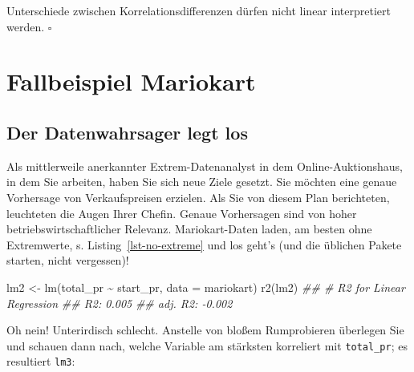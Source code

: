 \documentclass[
  letterpaper,
  twoside,
  open=any]{scrbook}
\newenvironment{Shaded}{\begin{snugshade}}{\end{snugshade}}
\newcommand{\AttributeTok}[1]{\textcolor[rgb]{0.40,0.45,0.13}{#1}}
\newcommand{\DocumentationTok}[1]{\textcolor[rgb]{0.37,0.37,0.37}{\textit{#1}}}
\newcommand{\FunctionTok}[1]{\textcolor[rgb]{0.28,0.35,0.67}{#1}}
\newcommand{\NormalTok}[1]{\textcolor[rgb]{0.00,0.23,0.31}{#1}}
\newcommand{\OtherTok}[1]{\textcolor[rgb]{0.00,0.23,0.31}{#1}}
\newcommand{\SpecialCharTok}[1]{\textcolor[rgb]{0.37,0.37,0.37}{#1}}
\theoremstyle{definition}
\theoremstyle{definition}
\theoremstyle{definition}
\theoremstyle{remark}
\begin{document}
\begin{tcolorbox}[enhanced jigsaw, colframe=quarto-callout-caution-color-frame, arc=.35mm, leftrule=.75mm, bottomtitle=1mm, titlerule=0mm, colbacktitle=quarto-callout-caution-color!10!white, breakable, bottomrule=.15mm, colback=white, left=2mm, rightrule=.15mm, opacityback=0, toptitle=1mm, toprule=.15mm, opacitybacktitle=0.6, title=\textcolor{quarto-callout-caution-color}{\faFire}\hspace{0.5em}{Vorsicht}, coltitle=black]

Unterschiede zwischen Korrelationsdifferenzen dürfen nicht linear
interpretiert werden. \(\square\)

\end{tcolorbox}

\section{Fallbeispiel Mariokart}\label{fallbeispiel-mariokart}

\subsection{Der Datenwahrsager legt
los}\label{der-datenwahrsager-legt-los}

Als mittlerweile anerkannter Extrem-Datenanalyst in dem
Online-Auktionshaus, in dem Sie arbeiten, haben Sie sich neue Ziele
gesetzt. Sie möchten eine genaue Vorhersage von Verkaufspreisen
erzielen. Als Sie von diesem Plan berichteten, leuchteten die Augen
Ihrer Chefin. Genaue Vorhersagen sind von hoher betriebswirtschaftlicher
Relevanz. Mariokart-Daten laden, am besten ohne Extremwerte, s.
Listing~\ref{lst-no-extreme} und los geht's (und die üblichen Pakete
starten, nicht vergessen)!

\begin{Shaded}
\begin{Highlighting}[]
\NormalTok{lm2 }\OtherTok{\textless{}{-}} \FunctionTok{lm}\NormalTok{(total\_pr }\SpecialCharTok{\textasciitilde{}}\NormalTok{ start\_pr, }\AttributeTok{data =}\NormalTok{ mariokart)}
\FunctionTok{r2}\NormalTok{(lm2)}
\DocumentationTok{\#\# \# R2 for Linear Regression}
\DocumentationTok{\#\#        R2: 0.005}
\DocumentationTok{\#\#   adj. R2: {-}0.002}
\end{Highlighting}
\end{Shaded}

Oh nein! Unterirdisch schlecht. Anstelle von bloßem Rumprobieren
überlegen Sie und schauen dann nach, welche Variable am stärksten
korreliert mit \texttt{total\_pr}; es resultiert \texttt{lm3}:
\end{document}
